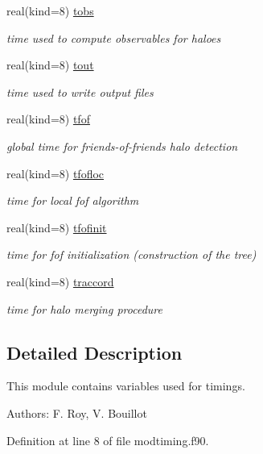 \begin{DoxyCompactItemize}
real(kind=8) \hyperlink{classmodtiming_a83f5f02456356934410977b127c6308c}{tobs}
\begin{DoxyCompactList}\small\item\em time used to compute observables for haloes \end{DoxyCompactList}\item 
real(kind=8) \hyperlink{classmodtiming_aad2ce715be55a32442a507f77e24f096}{tout}
\begin{DoxyCompactList}\small\item\em time used to write output files \end{DoxyCompactList}\item 
real(kind=8) \hyperlink{classmodtiming_ac6dbf200ea4d6d6248bb9df21ed8d2a7}{tfof}
\begin{DoxyCompactList}\small\item\em global time for friends-\/of-\/friends halo detection \end{DoxyCompactList}\item 
real(kind=8) \hyperlink{classmodtiming_a2574a405aaa97058f43e1e6b0b1d96e1}{tfofloc}
\begin{DoxyCompactList}\small\item\em time for local fof algorithm \end{DoxyCompactList}\item 
real(kind=8) \hyperlink{classmodtiming_a2c5b98c383953b670ee94c1022c2d822}{tfofinit}
\begin{DoxyCompactList}\small\item\em time for fof initialization (construction of the tree) \end{DoxyCompactList}\item 
real(kind=8) \hyperlink{classmodtiming_a9b8eac461e18e3b6c057420bae5b004e}{traccord}
\begin{DoxyCompactList}\small\item\em time for halo merging procedure \end{DoxyCompactList}\end{DoxyCompactItemize}


\subsection{Detailed Description}
This module contains variables used for timings. 

Authors\-: F. Roy, V. Bouillot 

Definition at line 8 of file modtiming.\-f90.



